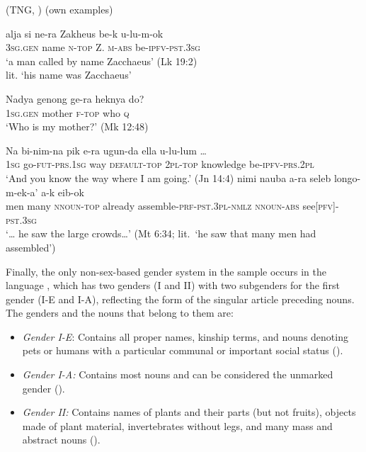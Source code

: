 \documentclass[output=collectionpaper]{langsci/langscibook}
\begin{document}
\ea
\label{ex:Svard:3}
 (TNG, ) (own examples)\\
\begin{xlist}
\ex
\gll alja si ne-ra Zakheus be-k u-lu{}-m-ok\\
     \textsc{3sg.gen} name \textsc{n-top} Z. \textsc{m-abs} be-\textsc{i}\textsc{pfv-pst.3sg}\\
\glt `a man called by name Zacchaeus' (Lk 19:2)\footnotemark{}\\
lit. `his name was Zacchaeus'

\ex
\gll Nadya genong ge-ra heknya do?\\
     \textsc{1sg.gen} mother \textsc{f-top} who \textsc{q}\\
\glt `Who is my mother?' (Mk 12:48)

\ex
\gll Na bi-nim-na pik e-ra ugun-da ella u-lu-lum …\\
     \textsc{1sg} go-\textsc{fut-prs.1sg} way \textsc{default-top} \textsc{2pl-top} knowledge be-\textsc{ipfv-prs.2pl} {}\\
\glt `And you know the way where I am going.' (Jn 14:4)
\ex
\gll {\ldots} nimi nauba a-ra seleb longo-m-ek-a' a-k eib-ok\\
    {} men many \textsc{nnoun-top} already assemble-\textsc{prf-pst.3pl-nmlz} \textsc{nnoun-abs} see[\textsc{pfv}]\textsc{{}-pst.3sg}\\
\glt `… he saw the large crowds…' (Mt 6:34; lit.\ `he saw that many men had assembled')
\end{xlist}
\z
{}

Finally, the only non-sex-based gender system in the sample occurs in the  language , which has two genders (I and II) with two subgenders for the first gender (I-E and I-A), reflecting the form of the singular article preceding nouns. The genders and the nouns that belong to them are:

\begin{itemize}
\item \textit{Gender I-E}: Contains all proper names, kinship terms, and nouns denoting pets or humans with a particular communal or important social status (\citealt[334--335]{Mosel2000}).

\item \textit{Gender I-A:} Contains most nouns and can be considered the unmarked gender (\citealt[336--338]{Mosel2000}).

\item \textit{Gender II:} Contains names of plants and their parts (but not fruits), objects made of plant material, invertebrates without legs, and many mass and abstract nouns (\citealt[338]{Mosel2000}).
\end{itemize}
\end{document}
